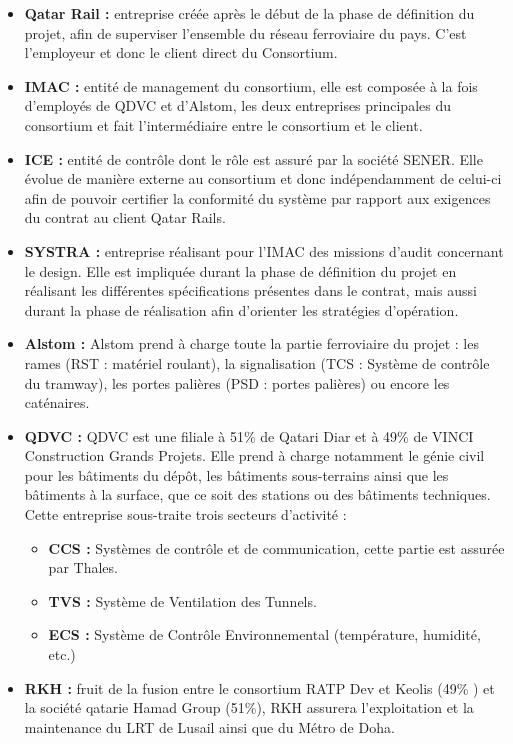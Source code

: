 \begin{itemize}
\item \textbf{Qatar Rail :} entreprise créée après le début de la phase de définition du projet, afin de superviser l'ensemble du réseau ferroviaire du pays. C'est l'employeur et donc le client direct du Consortium.
\item \textbf{IMAC :} entité de management du consortium, elle est composée à la fois d'employés de QDVC et d'Alstom, les deux entreprises principales du consortium et fait l'intermédiaire entre le consortium et le client.
\item \textbf{ICE :} entité de contrôle dont le rôle est assuré par la société SENER. Elle évolue de manière externe au consortium et donc indépendamment  de celui-ci afin de pouvoir certifier la conformité du système par rapport aux exigences du contrat au client Qatar Rails.
\item \textbf{SYSTRA :} entreprise réalisant pour l'IMAC des missions d'audit concernant le design. Elle est impliquée durant la phase de définition du projet en réalisant les différentes spécifications présentes dans le contrat, mais aussi durant la phase de réalisation afin d'orienter les stratégies d'opération.
\item \textbf{Alstom :} Alstom prend à charge toute la partie ferroviaire du projet : les rames (\gls{RST} : matériel roulant), la signalisation (\gls{TCS} : Système de contrôle du tramway), les portes palières (\gls{PSD} : portes palières) ou encore les caténaires.
\item \textbf{QDVC :} QDVC est une  filiale à 51\% de Qatari Diar et à 49\% de VINCI Construction Grands Projets. Elle prend à charge notamment le génie civil pour les bâtiments du dépôt, les bâtiments sous-terrains ainsi que les bâtiments à la surface, que ce soit des stations ou des bâtiments techniques. Cette entreprise sous-traite trois secteurs d'activité :
\begin{itemize}
\item \textbf{\gls{CCS} :} Systèmes de contrôle et de communication, cette partie est assurée par Thales.
\item \textbf{\gls{TVS} :} Système de Ventilation des Tunnels.
\item \textbf{\gls{ECS} :} Système de Contrôle Environnemental (température, humidité, etc.)
\end{itemize}
\item \textbf{RKH :} fruit de la fusion entre le consortium RATP Dev et Keolis (49\% ) et la société qatarie Hamad Group (51\%), RKH assurera l'exploitation et la maintenance du LRT de Lusail ainsi que du Métro de Doha.
\end{itemize}

